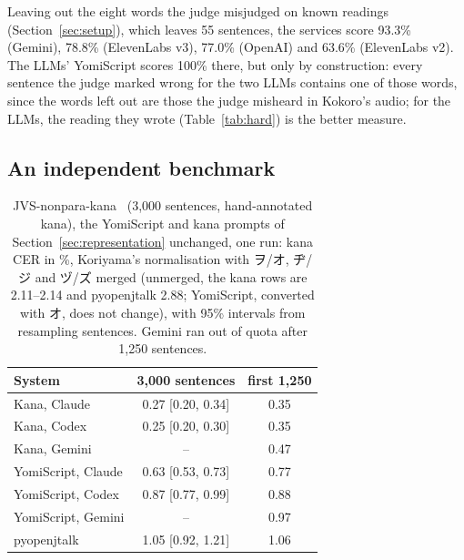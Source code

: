 \documentclass[11pt,a4paper]{article}
\begin{document}
Leaving out the eight words the judge misjudged on known readings (Section~\ref{sec:setup}), which leaves 55 sentences,
the services score 93.3\% (Gemini), 78.8\% (ElevenLabs v3), 77.0\% (OpenAI) and 63.6\% (ElevenLabs v2). The LLMs'
YomiScript scores 100\% there, but only by construction: every sentence the judge marked wrong for the two LLMs
contains one of those words, since the words left out are those the judge misheard in
Kokoro's audio; for the LLMs, the reading they wrote (Table~\ref{tab:hard}) is the better measure.

\subsection{An independent benchmark}\label{sec:koriyama}

\begin{table}[t]
\centering\small
\caption{JVS-nonpara-kana~\citep{koriyama2026g2p} (3{,}000 sentences, hand-annotated kana), the YomiScript and kana
prompts of Section~\ref{sec:representation} unchanged, one run: kana CER in \%, Koriyama's normalisation with ヲ/オ,
ヂ/ジ and ヅ/ズ merged (unmerged, the kana rows are 2.11--2.14 and pyopenjtalk 2.88; YomiScript, converted with オ,
does not change), with 95\% intervals from resampling sentences. Gemini ran out of quota after 1{,}250 sentences.}
\label{tab:koriyama}
\begin{tabular}{lcc}
\toprule
System & 3{,}000 sentences & first 1{,}250\\
\midrule
Kana, Claude & 0.27 [0.20, 0.34] & 0.35\\
Kana, Codex & 0.25 [0.20, 0.30] & 0.35\\
Kana, Gemini & -- & 0.47\\
YomiScript, Claude & 0.63 [0.53, 0.73] & 0.77\\
YomiScript, Codex & 0.87 [0.77, 0.99] & 0.88\\
YomiScript, Gemini & -- & 0.97\\
pyopenjtalk & 1.05 [0.92, 1.21] & 1.06\\
\bottomrule
\end{tabular}
\end{table}
\end{document}
